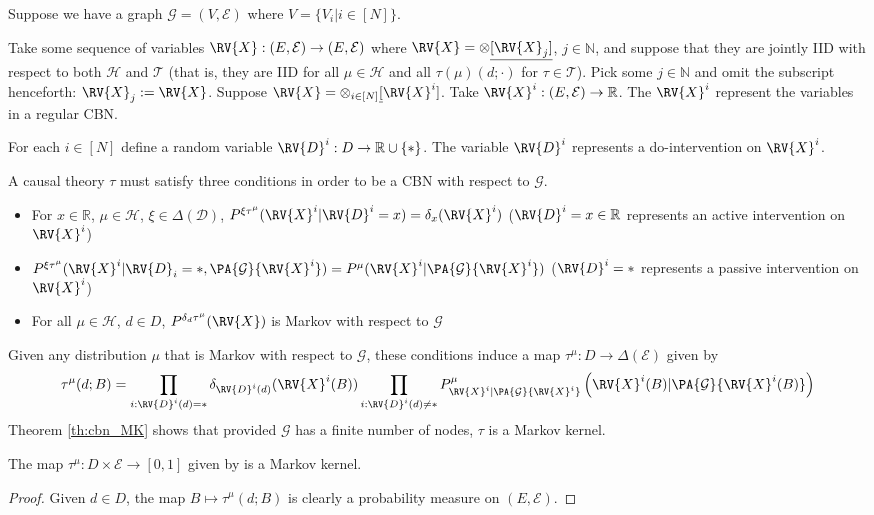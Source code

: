 Suppose we have a graph $\mathcal{G}=(V,\mathscr{E})$ where $V=\{V_i|i\in [N]\}$.

Take some sequence of variables $\RV{X}:(E,\mathcal{E})\to (E,\mathcal{E})$ where $\RV{X} = \otimes\underline{[\RV{X}_j]}$, $j\in \mathbb{N}$, and suppose that they are jointly IID with respect to both $\mathscr{H}$ and $\mathscr{T}$ (that is, they are IID for all $\mu\in\mathscr{H}$ and all  $\tau(\mu)(d;\cdot)$ for $\tau \in \mathscr{T}$). Pick some $j\in \mathbb{N}$ and omit the subscript henceforth: $\RV{X}_j:=\RV{X}$. Suppose $\RV{X} = \otimes_{i\in[N]}\underline[\RV{X}^i]$. Take $\RV{X}^i:(E,\mathcal{E})\to \mathbb{R}$. The $\RV{X}^i$ represent the variables in a regular CBN.

For each $i\in [N]$ define a random variable $\RV{D}^i:D\to \mathbb{R}\cup\{*\}$. The variable $\RV{D}^i$ represents a do-intervention on $\RV{X}^i$.

A causal theory $\tau$ must satisfy three conditions in order to be a CBN with respect to $\mathcal{G}$.

\begin{itemize}
    \item For $x\in \mathbb{R}$, $\mu\in \mathscr{H}$, $\xi\in \Delta(\mathcal{D})$,  $P^{\xi \tau^\mu}(\RV{X}^i|\RV{D}^i=x)=\delta_x(\RV{X}^i)$ ($\RV{D}^i=x\in \mathbb{R}$ represents an active intervention on $\RV{X}^i$)
    \item $P^{\xi \tau^\mu}(\RV{X}^i|\RV{D}_i=*,\PA{\mathcal{G}}{\RV{X}^i}) = P^\mu(\RV{X}^i|\PA{\mathcal{G}}{\RV{X}^i})$ ($\RV{D}^i=*$ represents a passive intervention on $\RV{X}^i$)
    \item For all $\mu\in \mathscr{H}$, $d\in D$, $P^{\delta_d \tau^\mu}(\RV{X})$ is Markov with respect to $\mathcal{G}$
\end{itemize}

Given any distribution $\mu$ that is Markov with respect to $\mathcal{G}$, these conditions induce a map $\tau^\mu:D\to \Delta(\mathcal{E})$ given by\cite{pearl_causality:_2009}
\begin{align}
    \tau^\mu(d;B) = \prod_{i:\RV{D}^i(d)=*} \delta_{\RV{D}^i(d)} (\RV{X}^i(B)) \prod_{i:\RV{D}^i(d)\neq *} P^{\mu}_{\RV{X}^i|\PA{\mathcal{G}}{\RV{X}^i}} \left(\RV{X}^i(B)|\PA{\mathcal{G}}{\RV{X}^i(B)}\right)
\end{align}
Theorem \ref{th:cbn_MK} shows that provided $\mathcal{G}$ has a finite number of nodes, $\tau$ is a Markov kernel.

\begin{theorem}\label{th:cbn_MK}
The map $\tau^\mu:D\times \mathcal{E}\to [0,1]$ given by  is a Markov kernel.
\end{theorem}

\begin{proof}
Given $d\in D$, the map $B\mapsto \tau^\mu(d;B)$ is clearly a probability measure on $(E,\mathcal{E})$.

 
\end{proof}